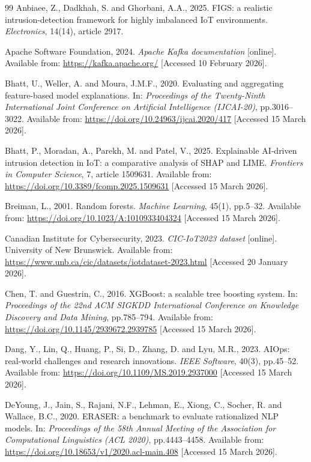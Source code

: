 \documentclass[12pt,a4paper]{report}
\begin{document}
\begin{thebibliography}{99}
Anbiaee, Z., Dadkhah, S. and Ghorbani, A.A., 2025. FIGS: a realistic intrusion-detection framework for highly imbalanced IoT environments. \textit{Electronics}, 14(14), article 2917.

Apache Software Foundation, 2024. \textit{Apache Kafka documentation} [online]. Available from: \url{https://kafka.apache.org/} [Accessed 10 February 2026].

Bhatt, U., Weller, A. and Moura, J.M.F., 2020. Evaluating and aggregating feature-based model explanations. In: \textit{Proceedings of the Twenty-Ninth International Joint Conference on Artificial Intelligence (IJCAI-20)}, pp.3016--3022. Available from: \url{https://doi.org/10.24963/ijcai.2020/417} [Accessed 15 March 2026].

Bhatt, P., Moradan, A., Parekh, M. and Patel, V., 2025. Explainable AI-driven intrusion detection in IoT: a comparative analysis of SHAP and LIME. \textit{Frontiers in Computer Science}, 7, article 1509631. Available from: \url{https://doi.org/10.3389/fcomp.2025.1509631} [Accessed 15 March 2026].

Breiman, L., 2001. Random forests. \textit{Machine Learning}, 45(1), pp.5--32. Available from: \url{https://doi.org/10.1023/A:1010933404324} [Accessed 15 March 2026].

Canadian Institute for Cybersecurity, 2023. \textit{CIC-IoT2023 dataset} [online]. University of New Brunswick. Available from: \url{https://www.unb.ca/cic/datasets/iotdataset-2023.html} [Accessed 20 January 2026].

Chen, T. and Guestrin, C., 2016. XGBoost: a scalable tree boosting system. In: \textit{Proceedings of the 22nd ACM SIGKDD International Conference on Knowledge Discovery and Data Mining}, pp.785--794. Available from: \url{https://doi.org/10.1145/2939672.2939785} [Accessed 15 March 2026].

Dang, Y., Lin, Q., Huang, P., Si, D., Zhang, D. and Lyu, M.R., 2023. AIOps: real-world challenges and research innovations. \textit{IEEE Software}, 40(3), pp.45--52. Available from: \url{https://doi.org/10.1109/MS.2019.2937000} [Accessed 15 March 2026].

DeYoung, J., Jain, S., Rajani, N.F., Lehman, E., Xiong, C., Socher, R. and Wallace, B.C., 2020. ERASER: a benchmark to evaluate rationalized NLP models. In: \textit{Proceedings of the 58th Annual Meeting of the Association for Computational Linguistics (ACL 2020)}, pp.4443--4458. Available from: \url{https://doi.org/10.18653/v1/2020.acl-main.408} [Accessed 15 March 2026].


\end{thebibliography}
\end{document}
